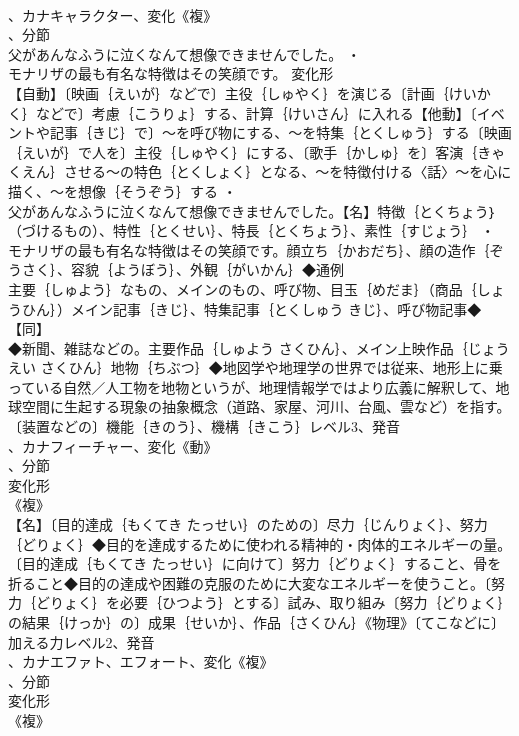 \documentclass[8pt]{extreport}
\begin{document}
\begin{CJK}{UTF8}{min}
\\	、カナキャラクター、変化《複》
\\	、分節
\\	父があんなふうに泣くなんて想像できませんでした。 ・
\\	モナリザの最も有名な特徴はその笑顔です。	変化形 
\\	【自動】〔映画｛えいが｝などで〕主役｛しゅやく｝を演じる〔計画｛けいかく｝などで〕考慮｛こうりょ｝する、計算｛けいさん｝に入れる【他動】〔イベントや記事｛きじ｝で〕～を呼び物にする、～を特集｛とくしゅう｝する〔映画｛えいが｝で人を〕主役｛しゅやく｝にする、〔歌手｛かしゅ｝を〕客演｛きゃくえん｝させる～の特色｛とくしょく｝となる、～を特徴付ける〈話〉～を心に描く、～を想像｛そうぞう｝する ・
\\	父があんなふうに泣くなんて想像できませんでした。【名】特徴｛とくちょう｝（づけるもの）、特性｛とくせい｝、特長｛とくちょう｝、素性｛すじょう｝ ・
\\	モナリザの最も有名な特徴はその笑顔です。顔立ち｛かおだち｝、顔の造作｛ぞうさく｝、容貌｛ようぼう｝、外観｛がいかん｝◆通例
\\	主要｛しゅよう｝なもの、メインのもの、呼び物、目玉｛めだま｝（商品｛しょうひん｝）メイン記事｛きじ｝、特集記事｛とくしゅう きじ｝、呼び物記事◆【同】
\\	◆新聞、雑誌などの。主要作品｛しゅよう さくひん｝、メイン上映作品｛じょうえい さくひん｝地物｛ちぶつ｝◆地図学や地理学の世界では従来、地形上に乗っている自然／人工物を地物というが、地理情報学ではより広義に解釈して、地球空間に生起する現象の抽象概念（道路、家屋、河川、台風、雲など）を指す。〔装置などの〕機能｛きのう｝、機構｛きこう｝レベル3、発音
\\	、カナフィーチャー、変化《動》
\\	、分節
\\	変化形 
\\	《複》
\\	【名】〔目的達成｛もくてき たっせい｝のための〕尽力｛じんりょく｝、努力｛どりょく｝◆目的を達成するために使われる精神的・肉体的エネルギーの量。〔目的達成｛もくてき たっせい｝に向けて〕努力｛どりょく｝すること、骨を折ること◆目的の達成や困難の克服のために大変なエネルギーを使うこと。〔努力｛どりょく｝を必要｛ひつよう｝とする〕試み、取り組み〔努力｛どりょく｝の結果｛けっか｝の〕成果｛せいか｝、作品｛さくひん｝《物理》〔てこなどに〕加える力レベル2、発音
\\	、カナエファト、エフォート、変化《複》
\\	、分節
\\	変化形 
\\	《複》

\end{CJK}
\end{document}
